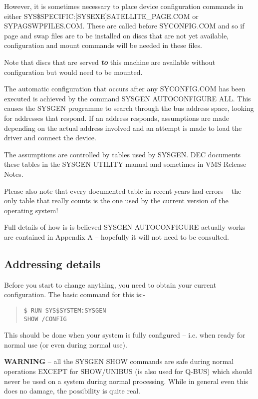 \begin{sloppypar}
However, it is sometimes necessary to place device configuration commands
in either SYS\$SPECIFIC:[SYSEXE]SATELLITE\_PAGE.COM or SYPAGSWPFILES.COM.
These are called before SYCONFIG.COM and so if page and swap files are to
be installed on discs that are not yet available, configuration and mount
commands will be needed in these files.
\end{sloppypar}

Note that discs that are served {\bf\it to} this machine are available without
configuration but would need to be mounted.

The automatic configuration that occurs after any SYCONFIG.COM has been
executed is achieved by the command SYSGEN AUTOCONFIGURE ALL.
This causes the SYSGEN programme to search through the bus address space,
looking for addresses that respond.
If an address responds, assumptions are made depending on the actual address
involved and an attempt is made to load the driver and connect the device.

The assumptions are controlled by tables used by SYSGEN.
DEC documents these tables in the SYSGEN UTILITY manual and sometimes in
VMS Release Notes.

Please also note that every documented table in recent years had errors
--  the only table that really counts is the one used by the current version
of the operating system!

Full details of how is is believed SYSGEN AUTOCONFIGURE actually works
  are contained in Appendix A -- hopefully it will not need to be consulted.

\subsection{Addressing details}

Before you start to change anything, you need to obtain your
 current configuration. The basic command for this is:-
\begin{quote}
\begin{verbatim}
$ RUN SYS$SYSTEM:SYSGEN
SHOW /CONFIG
\end{verbatim}
\end{quote}

This should be done when your system is fully configured -- i.e.
when ready for normal use (or even during normal use).

{\bf WARNING} -- all the SYSGEN SHOW commands are safe during normal
 operations EXCEPT for SHOW/UNIBUS (is also used for Q-BUS) which should
 never be used on a system during normal processing.
While in general even this does no damage, the possibility is quite real.

